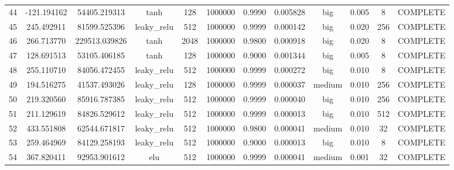 \begin{longtable}{cccccccccccc}
                       44 &                -121.194162 &                       54405.219313 &            tanh &         128 &      1000000 & 0.9990 &       0.005828 &       big & 0.005 &           8 & COMPLETE \\
                       45 &                 245.492911 &                       81599.525396 &     leaky\_relu &         512 &      1000000 & 0.9999 &       0.000142 &       big & 0.020 &         256 & COMPLETE \\
                       46 &                 266.713770 &                      229513.039826 &            tanh &        2048 &      1000000 & 0.9800 &       0.000918 &       big & 0.020 &           8 & COMPLETE \\
                       47 &                 128.691513 &                       53105.406185 &            tanh &         128 &      1000000 & 0.9000 &       0.001344 &       big & 0.005 &           8 & COMPLETE \\
                       48 &                 255.110710 &                       84056.472455 &     leaky\_relu &         512 &      1000000 & 0.9999 &       0.000272 &       big & 0.010 &           8 & COMPLETE \\
                       49 &                 194.516275 &                       41537.493026 &     leaky\_relu &         128 &      1000000 & 0.9999 &       0.000037 &    medium & 0.010 &         256 & COMPLETE \\
                       50 &                 219.320560 &                       85916.787385 &     leaky\_relu &         512 &      1000000 & 0.9999 &       0.000040 &       big & 0.010 &         256 & COMPLETE \\
                       51 &                 211.129619 &                       84826.529612 &     leaky\_relu &         512 &      1000000 & 0.9999 &       0.000013 &       big & 0.010 &         512 & COMPLETE \\
                       52 &                 433.551808 &                       62544.671817 &     leaky\_relu &         512 &      1000000 & 0.9800 &       0.000041 &    medium & 0.010 &          32 & COMPLETE \\
                       53 &                 259.464969 &                       84129.258193 &     leaky\_relu &         512 &      1000000 & 0.9000 &       0.000013 &       big & 0.010 &           8 & COMPLETE \\
                       54 &                 367.820411 &                       92953.901612 &             elu &         512 &      1000000 & 0.9999 &       0.000041 &    medium & 0.001 &          32 & COMPLETE \\

\end{longtable}
